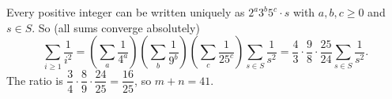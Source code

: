 Every positive integer can be written uniquely as $2^a3^b5^c\cdot s$ with $a,b,c\ge0$ and $s\in S$. So (all sums converge absolutely)
\[\sum_{i\ge1}\dfrac1{i^2}=\left(\sum_a\dfrac1{4^a}\right)\left(\sum_b\dfrac1{9^b}\right)\left(\sum_c\dfrac1{25^c}\right)\sum_{s\in S}\dfrac1{s^2}=\dfrac43\cdot\dfrac98\cdot\dfrac{25}{24}\sum_{s\in S}\dfrac1{s^2}.\]
The ratio is $\dfrac34\cdot\dfrac89\cdot\dfrac{24}{25}=\dfrac{16}{25}$, so $m+n=\boxed{41}$.
